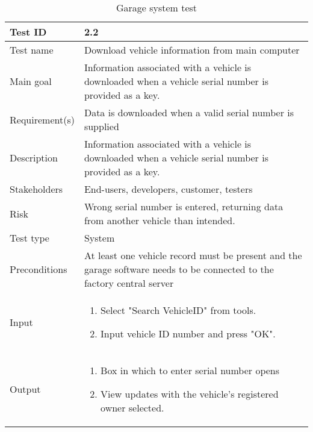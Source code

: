 \begin{table}[H]
\centering
\caption{Garage system test}
\begin{tabularx}{1.0\textwidth}{
    |p{}     %
    |p{}|    %
}
\hline

Test ID
& 2.2
\\
\hline

Test name
& Download vehicle information from main computer
\\
\hline

Main goal
& Information associated with a vehicle is downloaded when a vehicle serial number is provided as a key.
\\
\hline

Requirement(s)
& Data is downloaded when a valid serial number is supplied
\\
\hline

Description
& Information associated with a vehicle is downloaded when a vehicle serial number is provided as a key.
\\
\hline

Stakeholders
& End-users, developers, customer, testers
\\
\hline

Risk
& Wrong serial number is entered, returning data from another vehicle than intended.
\\
\hline

Test type
& System
\\
\hline

Preconditions
& At least one vehicle record must be present and the garage software needs to be connected to the factory central server
\\
\hline

Input
& \begin{enumerate}
    \item Select "Search VehicleID" from tools.
    \item Input vehicle ID number and press "OK".
\end{enumerate}
\\
\hline

Output
& \begin{enumerate}
    \item Box in which to enter serial number opens
    \item View updates with the vehicle's registered owner selected.
\end{enumerate}
\\
\hline


\end{tabularx}
\end{table}
